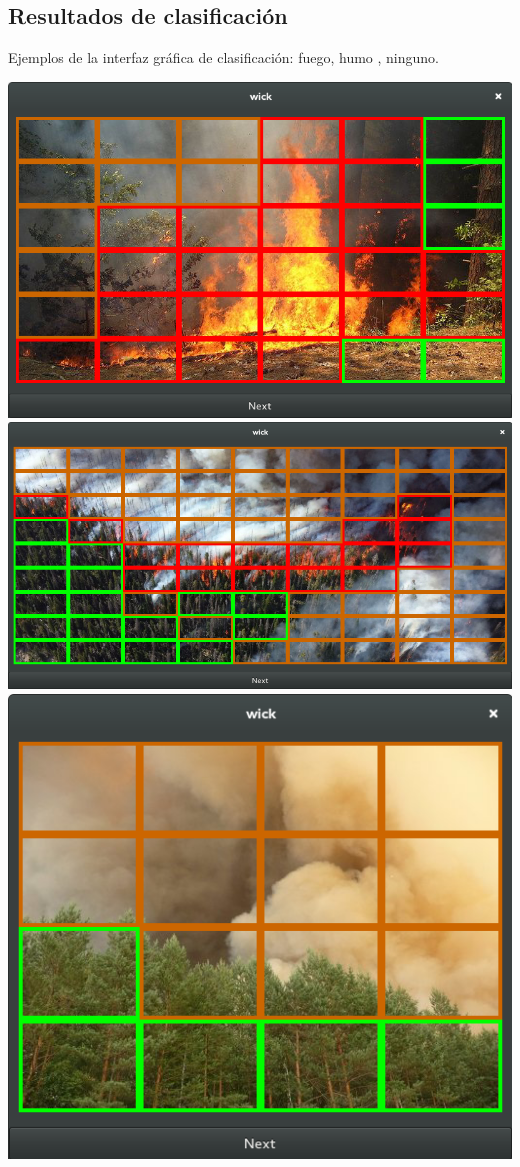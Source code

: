 \documentclass{article}
\begin{document}
\subsection{Resultados de clasificación}

Ejemplos de la interfaz gráfica de clasificación:  
{\color{red} fuego}, {\color{orange} humo} , {\color{green} ninguno}.
\begin{center}
    \includegraphics[width=\textwidth]{wick-class-01}
    \includegraphics[width=\textwidth]{wick-class-02}
    \includegraphics[width=\textwidth]{wick-class-03}

\end{center}
\end{document}
